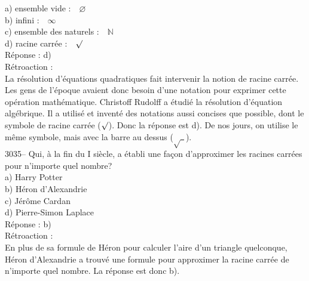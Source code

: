 \documentclass[letterpaper, 12pt]{article}
\begin{document}
a) ensemble vide :\ \ $\varnothing$\\
b) infini :\ \ $\infty$\\
c) ensemble des naturels :\ \ $\mathbb{N}$\\
d) racine carr\'ee :\ \ $\surd$\\

R\'eponse : d)\\

R\'etroaction :\\
La r\'esolution d'\'equations quadratiques fait intervenir la notion de racine carr\'ee. Les gens de l'\'epoque avaient donc besoin d'une notation pour exprimer cette op\'eration math\'ematique. Christoff Rudolff a \'etudi\'e la r\'esolution d'\'equation alg\'ebrique. Il a utilis\'e et invent\'e des notations aussi concises que possible, dont le symbole de racine carr\'ee ($\surd$). Donc la r\'eponse est d). De nos jours, on utilise le m\^eme symbole, mais avec la barre au dessus ($\sqrt{ \ \ }$).\\



3035-- Qui, \`a la fin du {\scriptsize I\ier{}} si\`ecle, a \'etabli une fa\c con d'approximer les racines carr\'ees pour n'importe quel nombre?\\

a) Harry Potter\\
b) H\'eron d'Alexandrie\\
c) J\'er\^ome Cardan\\
d) Pierre-Simon Laplace\\

R\'eponse : b)\\

R\'etroaction :\\
En plus de sa formule de H\'eron pour calculer l'aire d'un triangle quelconque, H\'eron d'Alexandrie a trouv\'e une formule pour approximer la racine carr\'ee de n'importe quel nombre. La r\'eponse est donc b).\\


\end{document}

